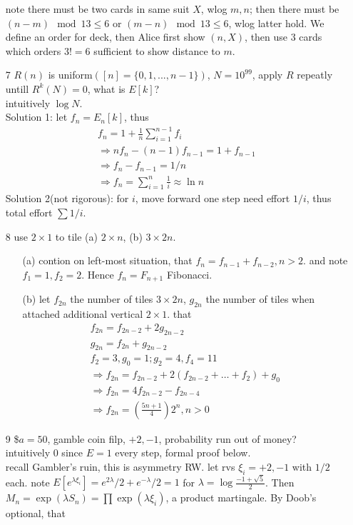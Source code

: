 \documentclass[paper=a4, fontsize=11pt]{scrartcl} %
\numberwithin{equation}{section} %
\numberwithin{figure}{section} %
\numberwithin{table}{section} %
\begin{document}
\begin{itemize}
	note there must be two cards in same suit $X$, wlog $m,n$; then there must be $(n-m)\mod 13\leq 6$ or $(m-n)\mod 13\leq 6$, wlog latter hold. We define an order for deck, then Alice first show $(n,X)$, then use $3$ cards which orders $3!=6$ sufficient to show distance to $m$.
	\item[7] $R(n)$ is uniform$([n]=\{0,1,...,n-1\})$, $N=10^{99}$, apply $R$ repeatly untill $R^k(N)=0$, what is $E[k]$?\\
	intuitively $\log N$.\\
	Solution 1: let $f_n=E_n[k]$, thus
	\begin{align}
		f_n = 1+\frac{1}{n}\sum_{i=1}^{n-1} f_i\\
		\Rightarrow nf_n-(n-1)f_{n-1} = 1 + f_{n-1}\\
		\Rightarrow f_n-f_{n-1} = 1/n\\
		\Rightarrow f_n = \sum_{i=1}^n \frac{1}{i} \approx \ln n
	\end{align}
	Solution 2(not rigorous): for $i$, move forward one step need effort $1/i$, thus total effort $\sum 1/i$.
	\item[8] use $2\times 1$ to tile (a) $2\times n$, (b) $3\times 2n$.
		\begin{itemize}
			\item[(a)] contion on left-most situation, that $f_n=f_{n-1}+f_{n-2}, n>2$. and note $f_1=1, f_2=2$. Hence $f_n= F_{n+1}$ Fibonacci.
			\item[(b)] let $f_{2n}$ the number of tiles $3\times 2n$, $g_{2n}$ the number of tiles when attached additional vertical $2\times 1$. that
			\begin{align}
				f_{2n} = f_{2n-2} + 2g_{2n-2}\\
				g_{2n} = f_{2n} + g_{2n-2}\\
				f_2 = 3, g_0 = 1; g_2= 4, f_4= 11\\
				\Rightarrow f_{2n} = f_{2n-2}+ 2(f_{2n-2}+\dots+ f_2)+ g_0\\
				\Rightarrow f_{2n} = 4f_{2n-2}-f_{2n-4}\\
				\Rightarrow f_{2n} = (\frac{5n+1}{4})2^n, n>0
			\end{align}
		\end{itemize}
	\item[9] \$$a=50$, gamble coin filp, $+2,-1$, probability run out of money?\\
	intuitively $0$ since $E=1$ every step, formal proof below.\\
	recall Gambler's ruin, this is asymmetry RW. let rvs $\xi_i=+2,-1$ with $1/2$ each. note $E[e^{\lambda \xi_i}]= e^{2\lambda}/2+ e^{-\lambda}/2 = 1$ for $\lambda=\log \frac{-1+\sqrt{5}}{2}$. Then $M_n=\exp(\lambda S_n)=\prod \exp(\lambda \xi_i)$, a product martingale. By Doob's optional, that

\end{itemize}
\end{document}
